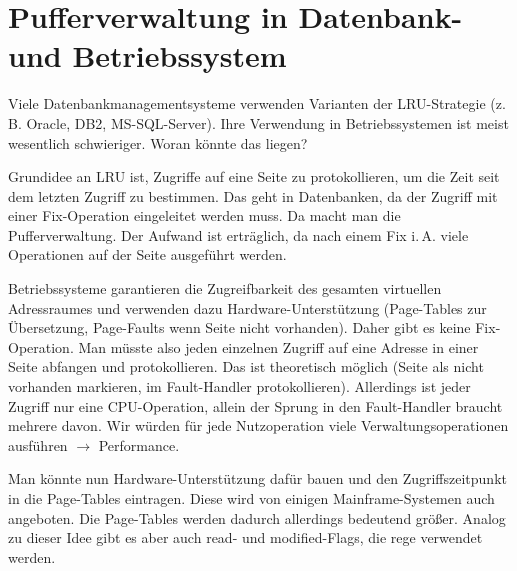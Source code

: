 \section{Pufferverwaltung in Datenbank- und Betriebssystem}
Viele Datenbankmanagementsysteme verwenden Varianten der LRU-Strategie (z.\,B. Oracle, DB2, MS-SQL-Server). Ihre Verwendung in Betriebssystemen ist meist wesentlich schwieriger. Woran könnte das liegen?

\begin{solution}
Grundidee an LRU ist, Zugriffe auf eine Seite zu protokollieren, um die Zeit seit dem letzten Zugriff  zu bestimmen. Das geht in Datenbanken, da der Zugriff mit einer Fix-Operation eingeleitet werden muss. Da macht man die Pufferverwaltung. Der Aufwand ist erträglich, da nach einem Fix i.\,A. viele Operationen auf der Seite ausgeführt werden.

Betriebssysteme garantieren die Zugreifbarkeit des gesamten virtuellen Adressraumes und verwenden dazu Hardware-Unterstützung (Page-Tables zur Übersetzung, Page-Faults wenn Seite nicht vorhanden). Daher gibt es keine Fix-Operation. Man müsste also jeden einzelnen Zugriff auf eine Adresse in einer Seite abfangen und protokollieren. Das ist theoretisch möglich (Seite als nicht vorhanden markieren, im Fault-Handler protokollieren). Allerdings ist jeder Zugriff nur eine CPU-Operation, allein der Sprung in den Fault-Handler braucht mehrere davon. Wir würden für jede Nutzoperation viele Verwaltungsoperationen ausführen $\rightarrow$ Performance.

Man könnte nun Hardware-Unterstützung dafür bauen und den Zugriffszeitpunkt in die Page-Tables eintragen. Diese wird von einigen Mainframe-Systemen auch angeboten. Die Page-Tables werden dadurch allerdings bedeutend größer. Analog zu dieser Idee gibt es aber auch read- und modified-Flags, die rege verwendet werden.
\end{solution}
